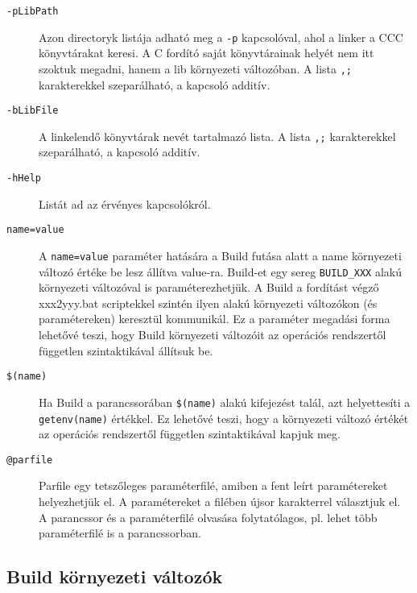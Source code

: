 \begin{description}
\item[{\tt -pLibPath}] 
  Azon directoryk listája adható meg a {\tt -p} kapcsolóval,
  ahol a linker a CCC könyvtárakat keresi. A C fordító saját
  könyvtárainak helyét nem itt szoktuk megadni, hanem a lib 
  környezeti változóban. A lista {\tt ,;} karakterekkel
  szeparálható, a kapcsoló additív.


\item[{\tt -bLibFile}] 
  A linkelendő könyvtárak nevét tartalmazó lista. 
  A lista {\tt ,;} karakterekkel szeparálható, a kapcsoló additív. 


\item[{\tt -hHelp}] 
  Listát ad az érvényes kapcsolókról.
  
  
\item[{\tt name=value}]  
  A {\tt name=value} paraméter hatására a Build futása alatt
  a name környezeti változó értéke be lesz állítva value-ra.
  Build-et egy sereg {\tt BUILD\_XXX} alakú környezeti változóval
  is paraméterezhetjük. A Build a fordítást végző xxx2yyy.bat  
  scriptekkel szintén ilyen alakú környezeti változókon 
  (és paramétereken) keresztül kommunikál. Ez a paraméter megadási 
  forma lehetővé teszi, hogy Build környezeti változóit az operációs
  rendszertől független szintaktikával állítsuk be.

\item[{\tt \$(name)}]  
  Ha Build a parancssorában \verb'$(name)' alakú kifejezést
  talál, azt helyettesíti a \verb'getenv(name)' értékkel.
  Ez lehetővé teszi, hogy a környezeti változó értékét
  az operációs rendszertől független szintaktikával kapjuk meg.  
 


\item[{\tt @parfile}] 
  Parfile egy tetszőleges paraméterfilé, amiben a fent leírt 
  paramétereket helyezhetjük el. A paramétereket a filében újsor 
  karakterrel választjuk el. A parancssor és a paraméterfilé olvasása
  folytatólagos, pl. lehet több paraméterfilé is a parancssorban.
\end{description}


\subsection{Build környezeti változók}

